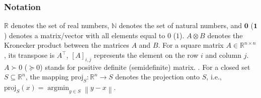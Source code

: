 \documentclass{IEEEtran}  %
\newcommand{\bs}{\boldsymbol}
\newcommand{\mc}{\mathcal}
\newcommand{\bb}{\mathbb}
\newcommand{\R}{\bb R}
\newcommand{\argmin}{\operatorname{argmin}}
\newcommand{\fix}{\mathrm{fix}}
\newcommand{\proj}{\mathrm{proj}}
\newcommand{\Id}{\mathrm{Id}}
\newcommand{\col}{\operatorname{col}}
\newcommand{\zer}{\operatorname{zer}}
\newcommand{\nc}{\mathrm{N}}
\newcommand{\0}{\mathbf{0}}
\newcommand{\1}{\mathbf{1}}
\newcommand{\edit}[1]{\color{blue}{#1}\color{black}}
\newcommand{\note}[1]{\textcolor{blue}{\texttt{#1}}}
\begin{document}
\subsubsection*{Notation}
$\R$ denotes the set of real numbers, $\bb N$ denotes the set of natural numbers, and  $\bs{0}$ ($\bs{1}$) denotes a matrix/vector with all elements equal to $0$ ($1$).
$A \otimes B$ denotes the Kronecker product between the matrices $A$ and $B$. For a square matrix $A \in \R^{n \times n}$, its transpose is $A^\top$, $[A]_{i,j}$ represents the element on the row $i$ and column $j$. $A \succ 0$ ($\succcurlyeq 0$) stands for positive definite (semidefinite) matrix.
\marginnote{\note{R4-9}}\edit{For any $x \in \bb R^n$, $\|x\|_A^2 = x^\top A x,$ with square symmetric matrix $A \succ 0$}. 
For a closed set $S \subseteq \R^n$, the mapping $\proj_{S}:\R^n \rightarrow S$ denotes the projection onto $S$, i.e., $\proj_{S}(x) = \argmin_{y \in S} \left\| y - x\right\|$. 

\end{document}
